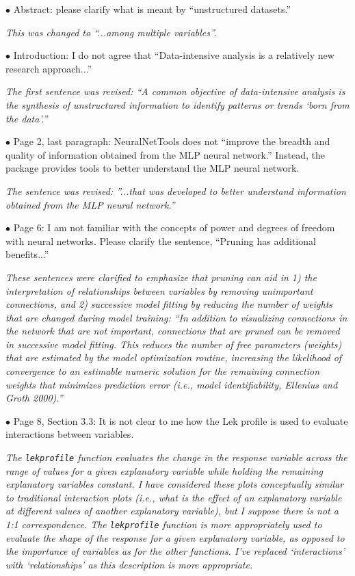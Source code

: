\documentclass[letterpaper,12pt]{article}
\begin{document}
$\bullet$ Abstract:  please clarify what is meant by ``unstructured datasets.''

{\it This was changed to ``...among multiple variables''.}

$\bullet$ Introduction:  I do not agree that ``Data-intensive analysis is a relatively new research approach...''

{\it The first sentence was revised: ``A common objective of data-intensive analysis is the synthesis of unstructured information to identify patterns or trends `born from the data'.''}

$\bullet$ Page 2, last paragraph:  NeuralNetTools does not ``improve the breadth and quality of information obtained from the MLP neural network.''  Instead, the package provides tools to better understand the MLP neural network.

{\it The sentence was revised: ''...that was developed to better understand information obtained from the MLP neural network.''}

$\bullet$ Page 6:  I am not familiar with the concepts of power and degrees of freedom with neural networks.  Please clarify the sentence, ``Pruning has additional benefits...''

{\it  These sentences were clarified to emphasize that pruning can aid in 1) the interpretation of relationships between variables by removing unimportant connections, and 2) successive model fitting by reducing the number of weights that are changed during model training: ``In addition to visualizing connections in the network that are not important, connections that are pruned can be removed in successive model fitting.  This reduces the number of free parameters (weights) that are  estimated by the model optimization routine, increasing the likelihood of convergence to an estimable numeric solution for the remaining connection weights that minimizes prediction error (i.e., model identifiability, Ellenius and Groth 2000).'' }

$\bullet$ Page 8, Section 3.3:  It is not clear to me how the Lek profile is used to evaluate interactions between variables.

{\it The \texttt{lekprofile} function evaluates the change in the response variable across the range of values for a given explanatory variable while holding the remaining explanatory variables constant.  I have considered these plots conceptually similar to traditional interaction plots (i.e., what is the effect of an explanatory variable at different values of another explanatory variable), but I suppose there is not a 1:1 correspondence. The \texttt{lekprofile} function is more appropriately used to evaluate the shape of the response for a given explanatory variable, as opposed to the importance of variables as for the other functions. I've replaced `interactions' with `relationships' as this description is more appropriate.}
\end{document}
